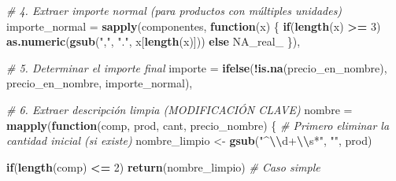 \documentclass[,,,oneauthor,pdftex]{Definitions/mdpi}
\newenvironment{Shaded}{\begin{snugshade}}{\end{snugshade}}
\newcommand{\AttributeTok}[1]{\textcolor[rgb]{0.13,0.29,0.53}{#1}}
\newcommand{\CommentTok}[1]{\textcolor[rgb]{0.56,0.35,0.01}{\textit{#1}}}
\newcommand{\ConstantTok}[1]{\textcolor[rgb]{0.56,0.35,0.01}{#1}}
\newcommand{\ControlFlowTok}[1]{\textcolor[rgb]{0.13,0.29,0.53}{\textbf{#1}}}
\newcommand{\DecValTok}[1]{\textcolor[rgb]{0.00,0.00,0.81}{#1}}
\newcommand{\FunctionTok}[1]{\textcolor[rgb]{0.13,0.29,0.53}{\textbf{#1}}}
\newcommand{\NormalTok}[1]{#1}
\newcommand{\OtherTok}[1]{\textcolor[rgb]{0.56,0.35,0.01}{#1}}
\newcommand{\SpecialCharTok}[1]{\textcolor[rgb]{0.81,0.36,0.00}{\textbf{#1}}}
\newcommand{\StringTok}[1]{\textcolor[rgb]{0.31,0.60,0.02}{#1}}
\begin{document}
\begin{Shaded}
\begin{Highlighting}[]
    \CommentTok{\# 4. Extraer importe normal (para productos con múltiples unidades)}
    \AttributeTok{importe\_normal =} \FunctionTok{sapply}\NormalTok{(componentes, }\ControlFlowTok{function}\NormalTok{(x) \{}
      \ControlFlowTok{if}\NormalTok{(}\FunctionTok{length}\NormalTok{(x) }\SpecialCharTok{\textgreater{}=} \DecValTok{3}\NormalTok{) }\FunctionTok{as.numeric}\NormalTok{(}\FunctionTok{gsub}\NormalTok{(}\StringTok{","}\NormalTok{, }\StringTok{"."}\NormalTok{, x[}\FunctionTok{length}\NormalTok{(x)])) }\ControlFlowTok{else} \ConstantTok{NA\_real\_}
\NormalTok{    \}),}
    
    \CommentTok{\# 5. Determinar el importe final}
    \AttributeTok{importe =} \FunctionTok{ifelse}\NormalTok{(}\SpecialCharTok{!}\FunctionTok{is.na}\NormalTok{(precio\_en\_nombre), precio\_en\_nombre, importe\_normal),}
    
    \CommentTok{\# 6. Extraer descripción limpia (MODIFICACIÓN CLAVE)}
    \AttributeTok{nombre =} \FunctionTok{mapply}\NormalTok{(}\ControlFlowTok{function}\NormalTok{(comp, prod, cant, precio\_nombre) \{}
      \CommentTok{\# Primero eliminar la cantidad inicial (si existe)}
\NormalTok{      nombre\_limpio }\OtherTok{\textless{}{-}} \FunctionTok{gsub}\NormalTok{(}\StringTok{"\^{}}\SpecialCharTok{\textbackslash{}\textbackslash{}}\StringTok{d+}\SpecialCharTok{\textbackslash{}\textbackslash{}}\StringTok{s*"}\NormalTok{, }\StringTok{""}\NormalTok{, prod)}
      
      \ControlFlowTok{if}\NormalTok{(}\FunctionTok{length}\NormalTok{(comp) }\SpecialCharTok{\textless{}=} \DecValTok{2}\NormalTok{) }\FunctionTok{return}\NormalTok{(nombre\_limpio)  }\CommentTok{\# Caso simple}
      

\end{Highlighting}
\end{Shaded}
\end{document}
